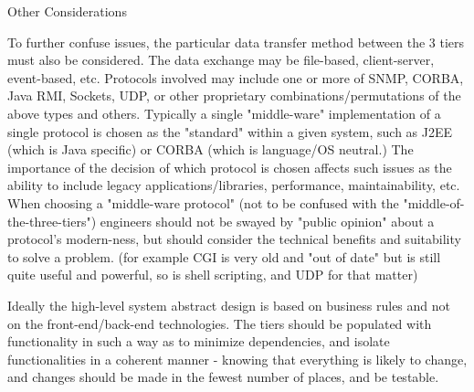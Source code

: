 \begin{obecne}{Other Considerations}

To further confuse issues, the particular data transfer method between the 3 tiers must also be considered. The data exchange may be file-based, client-server, event-based, etc. Protocols involved may include one or more of SNMP, CORBA, Java RMI, Sockets, UDP, or other proprietary combinations/permutations of the above types and others. Typically a single "middle-ware" implementation of a single protocol is chosen as the "standard" within a given system, such as J2EE (which is Java specific) or CORBA (which is language/OS neutral.) The importance of the decision of which protocol is chosen affects such issues as the ability to include legacy applications/libraries, performance, maintainability, etc. When choosing a "middle-ware protocol" (not to be confused with the "middle-of-the-three-tiers") engineers should not be swayed by "public opinion" about a protocol's modern-ness, but should consider the technical benefits and suitability to solve a problem. (for example CGI is very old and "out of date" but is still quite useful and powerful, so is shell scripting, and UDP for that matter)

Ideally the high-level system abstract design is based on business rules and not on the front-end/back-end technologies. The tiers should be populated with functionality in such a way as to minimize dependencies, and isolate functionalities in a coherent manner - knowing that everything is likely to change, and changes should be made in the fewest number of places, and be testable.
\end{obecne}

